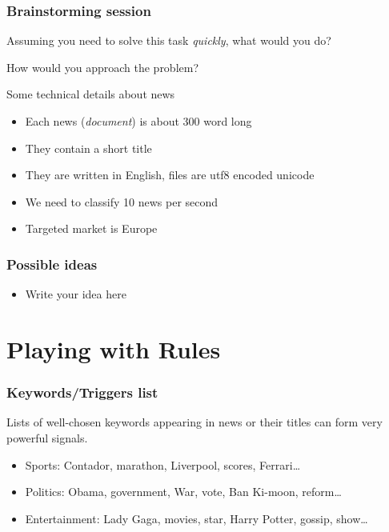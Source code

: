\documentclass[usenames,dvipsnames]{beamer}
\newcommand{\voc}[1]{\emph{\color{ForestGreen}#1}}
\begin{document}
\begin{frame}\frametitle{Brainstorming session}
Assuming you need to solve this task \emph{quickly}, what would you do?

How would you approach the problem?
\vspace{0.8cm}

\pause
\begin{block}{Some technical details about news}
\begin{itemize}
  \item Each news (\voc{document}) is about 300 word long
  \item They contain a short title
  \item They are written in English, files are utf8 encoded unicode
  \item We need to classify 10 news per second
  \item Targeted market is Europe
\end{itemize}
\end{block}

\end{frame}

\begin{frame}\frametitle{Possible ideas}
\begin{itemize}
  \item Write your idea here
\end{itemize}
\end{frame}


\section{Playing with Rules}
\begin{frame}\frametitle{Keywords/Triggers list}
Lists of well-chosen keywords appearing in news or their titles can form very powerful signals.
\vspace{0.4cm}

\begin{itemize}
  \item Sports: Contador, marathon, Liverpool, scores, Ferrari\ldots
  \item Politics: Obama, government, War, vote, Ban Ki-moon, reform\dots
  \item Entertainment: Lady Gaga, movies, star, Harry Potter, gossip, show\dots
\end{itemize}
\end{frame}
\end{document}
